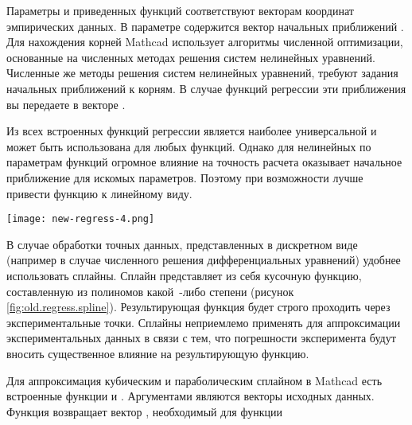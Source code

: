 Параметры  и  приведенных функций соответствуют векторам координат эмпирических данных. В параметре  содержится вектор начальных приближений . Для нахождения корней Mathcad использует алгоритмы численной оптимизации, основанные на численных методах решения систем нелинейных уравнений. Численные же методы решения систем нелинейных уравнений, требуют задания начальных приближений к корням. В случае функций регрессии эти приближения вы передаете в векторе .

Из всех встроенных функций регрессии  является наиболее универсальной и может быть использована для любых функций. Однако для нелинейных по параметрам функций огромное влияние на точность расчета оказывает начальное приближение   для искомых параметров. Поэтому при возможности лучше привести функцию к линейному виду.


\begin{center}
	\texttt{[image: new-regress-4.png]}
\end{center}

В случае обработки точных данных, представленных в дискретном виде (например в случае численного решения дифференциальных уравнений) удобнее использовать сплайны. Сплайн представляет из себя кусочную функцию, составленную из полиномов какой~-либо степени (рисунок \ref{fig:old.regress.spline}). Результирующая функция будет строго проходить через экспериментальные точки. Сплайны неприемлемо применять для аппроксимации экспериментальных данных в связи с тем, что погрешности эксперимента будут вносить существенное влияние на результирующую функцию.

Для аппроксимация кубическим и параболическим сплайном в Mathcad есть встроенные функции  и . Аргументами являются векторы исходных данных. Функция возвращает вектор , необходимый для функции 

